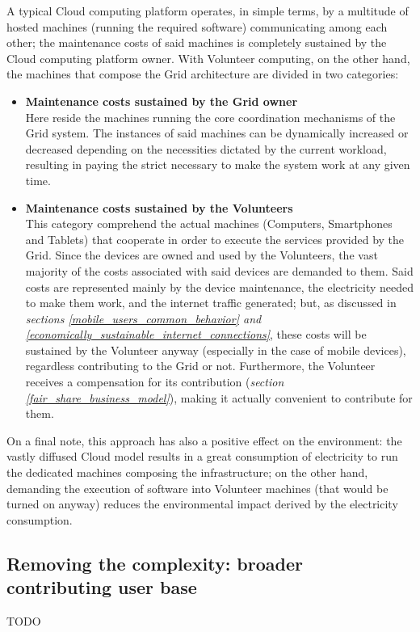 A typical Cloud computing platform operates, in simple terms, by a multitude of hosted machines (running the required software) communicating among each other; the maintenance costs of said machines is completely sustained by the Cloud computing platform owner. With Volunteer computing, on the other hand, the machines that compose the Grid architecture are divided in two categories:
\begin{itemize}
    \item \textbf{Maintenance costs sustained by the Grid owner}\\
    Here reside the machines running the core coordination mechanisms of the Grid system. The instances of said machines can be dynamically increased or decreased depending on the necessities dictated by the current workload, resulting in paying the strict necessary to make the system work at any given time.
    \item \textbf{Maintenance costs sustained by the Volunteers}\\
    This category comprehend the actual machines (Computers, Smartphones and Tablets) that cooperate in order to execute the services provided by the Grid. Since the devices are owned and used by the Volunteers, the vast majority of the costs associated with said devices are demanded to them. Said costs are represented mainly by the device maintenance, the electricity needed to make them work, and the internet traffic generated; but, as discussed in \textit{sections \ref{mobile_users_common_behavior} and \ref{economically_sustainable_internet_connections}}, these costs will be sustained by the Volunteer anyway (especially in the case of mobile devices), regardless contributing to the Grid or not. Furthermore, the Volunteer receives a compensation for its contribution (\textit{section \ref{fair_share_business_model}}), making it actually convenient to contribute for them.
\end{itemize}

On a final note, this approach has also a positive effect on the environment: the vastly diffused Cloud model results in a great consumption of electricity to run the dedicated machines composing the infrastructure; on the other hand, demanding the execution of software into Volunteer machines (that would be turned on anyway) reduces the environmental impact derived by the electricity consumption.

\subsection{Removing the complexity: broader contributing user base}
TODO

